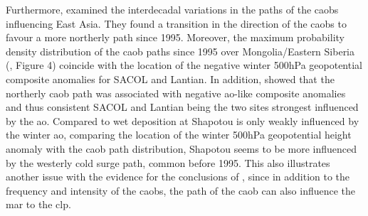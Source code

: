 Furthermore, \textcite{yang2020interdecadal} examined the interdecadal variations in the paths of the \acrshort{caob}s influencing East Asia. 
They found a transition in the direction of the \acrshort{caob}s to favour a more northerly path since 1995.
Moreover, the maximum probability density distribution of the \acrshort{caob} paths since 1995 over Mongolia/Eastern Siberia (\textcite{yang2020interdecadal}, Figure 4)  coincide with the location of the negative winter 500hPa geopotential composite anomalies for SACOL and Lantian. In addition, \textcite{yang2020interdecadal} showed that the northerly \acrshort{caob} path was associated with negative \acrshort{ao}-like composite anomalies and thus consistent SACOL and Lantian being the two sites strongest influenced by the \acrshort{ao}. Compared to wet deposition at Shapotou is only weakly influenced by the  winter \acrshort{ao}, comparing the location of the winter 500hPa geopotential height anomaly with the \acrshort{caob} path distribution, Shapotou seems to be more influenced by the westerly cold surge path, common before 1995.       
This also illustrates another issue with the evidence for the conclusions of \textcite{wyrwoll2016cold}, since in addition to the frequency and intensity of the \acrshort{caob}s, the path of the \acrshort{caob} can also influence the \acrshort{mar} to the \acrshort{clp}.  



